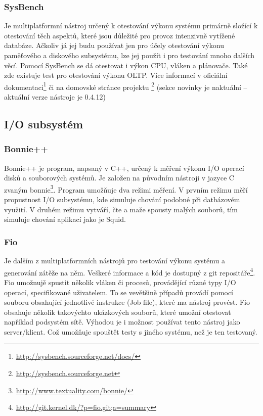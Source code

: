 \subsubsection{SysBench}
Je multiplatformní nástroj určený k otestování výkonu systému primárně složící k otestování těch aspektů, které jsou důležité pro provoz intenzivně vytížené databáze. Ačkoliv já jej budu používat jen pro účely otestování výkonu paměťového a diskového subsystému, lze jej použít i pro testování mnoho dalších věcí. Pomocí SysBench se dá otestovat i výkon CPU, vláken a plánovače. Také zde existuje test pro otestování výkonu OLTP. Více informací v oficiální dokumentaci\footnote{\url{http://sysbench.sourceforge.net/docs/}} či na domovské stránce projektu \footnote{\url{http://sysbench.sourceforge.net}} (sekce novinky je naktuální -- aktuální verze nástroje je 0.4.12)
\subsection{I/O subsystém}
\subsubsection{Bonnie++}
Bonnie++ je program, napsaný v C++, určený k měření výkonu I/O operací disků a souborových systémů. Je založen na původním nástroji v jazyce C zvaným bonnie\footnote{\url{http://www.textuality.com/bonnie/}}. Program umožňuje dva režimi měření. V prvním režimu měří propustnost I/O subsystému, kde simuluje chování podobné při datbázovém využití. V druhém režimu vytváří, čte a maže spousty malých souborů, tím simuluje chování aplikací jako je Squid.
\subsubsection{Fio}
Je dalším z multiplatformních nástrojů pro testování výkonu systému a generování zátěže na něm. Veškeré informace a kód je dostupný z git repositáře\footnote{\url{http://git.kernel.dk/?p=fio.git;a=summary}}. Fio umožnujě spustit několik vláken či procesů, provádějící různé typy I/O operací, specifikované uživatelem. To se vevětšině případů provádí pomocí souboru obsahující jednotlivé instrukce (Job file), které ma nástroj provést. Fio obsahuje několik takovýchto ukázkových souborů, které umožní otestovat například podsystém sítě. Výhodou je i možnost používat tento nástroj jako server/klient. Což umožňuje spouštět testy s jiného systému, než je ten testovaný.  
